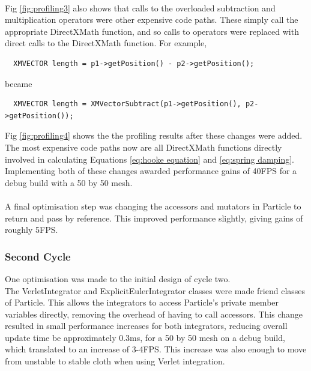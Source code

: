 \\Fig \ref{fig:profiling3} also shows that calls to the overloaded subtraction and multiplication operators were other expensive code paths. These simply call the appropriate DirectXMath function, and so calls to operators were replaced with direct calls to the DirectXMath function. For example, 
\begin{verbatim}
  XMVECTOR length = p1->getPosition() - p2->getPosition();
\end{verbatim}
became
\begin{verbatim}
  XMVECTOR length = XMVectorSubtract(p1->getPosition(), p2->getPosition());
\end{verbatim}
Fig \ref{fig:profiling4} shows the the profiling results after these changes were added. The most expensive code paths now are all DirectXMath functions directly involved in calculating Equations \ref{eq:hooke equation} and \ref{eq:spring damping}.
\\Implementing both of these changes awarded performance gains of 40FPS for a debug build with a 50 by 50 mesh.
\\\\A final optimisation step was changing the accessors and mutators in Particle to return and pass by reference. This improved performance slightly, giving gains of roughly 5FPS.

\subsubsection{Second Cycle}
One optimisation was made to the initial design of cycle two.
\\The VerletIntegrator and ExplicitEulerIntegrator classes were made friend classes of Particle. This allows the integrators to access Particle's private member variables directly, removing the overhead of having to call accessors. This change resulted in small performance increases for both integrators, reducing overall update time be approximately 0.3ms, for a 50 by 50 mesh on a debug build, which translated to an increase of 3-4FPS. This increase was also enough to move from unstable to stable cloth when using Verlet integration.

